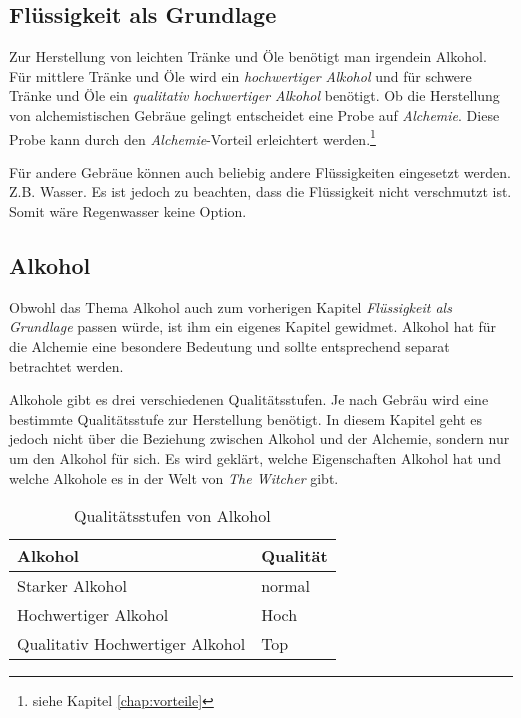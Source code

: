 \subsection{Flüssigkeit als Grundlage}
\label{chap:fluessigkeit_als_grundlage}
Zur Herstellung von leichten Tränke und Öle benötigt man irgendein Alkohol. Für mittlere Tränke und Öle wird ein \textit{hochwertiger Alkohol} und für schwere Tränke und Öle ein \textit{qualitativ hochwertiger Alkohol} benötigt. Ob die Herstellung von alchemistischen Gebräue gelingt entscheidet eine Probe auf \textit{Alchemie}. Diese Probe kann durch den \textit{Alchemie}-Vorteil erleichtert werden.\footnote{siehe Kapitel \ref{chap:vorteile}}

Für andere Gebräue können auch beliebig andere Flüssigkeiten eingesetzt werden. Z.B. Wasser. Es ist jedoch zu beachten, dass die Flüssigkeit nicht verschmutzt ist. Somit wäre Regenwasser keine Option. 

\subsection{Alkohol}
Obwohl das Thema Alkohol auch zum vorherigen Kapitel \textit{Flüssigkeit als Grundlage} passen würde, ist ihm ein eigenes Kapitel gewidmet. Alkohol hat für die Alchemie eine besondere Bedeutung und sollte entsprechend separat betrachtet werden.

Alkohole gibt es drei verschiedenen Qualitätsstufen. Je nach Gebräu wird eine bestimmte Qualitätsstufe zur Herstellung benötigt. In diesem Kapitel geht es jedoch nicht über die Beziehung zwischen Alkohol und der Alchemie, sondern nur um den Alkohol für sich. Es wird geklärt, welche Eigenschaften Alkohol hat und welche Alkohole es in der Welt von \textit{The Witcher} gibt.

\begin{table}[h]
\begin{center}
\begin{tabular}{|l|l|}
\hline
\textbf{Alkohol} & \textbf{Qualität} \\ \hline
Starker Alkohol & normal \\ \hline
Hochwertiger Alkohol & Hoch \\ \hline
Qualitativ Hochwertiger Alkohol & Top \\ \hline
\end{tabular}
\end{center}
\caption{Qualitätsstufen von Alkohol}
\label{tab:qualitaetsstufen_von_alkohol}
\end{table}

